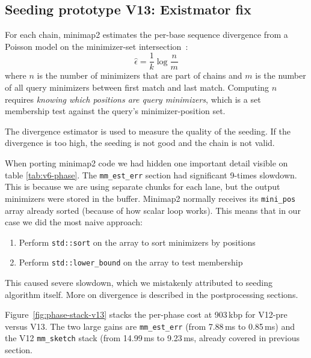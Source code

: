 \subsection{Seeding prototype V13: Existmator fix}
\label{sec:minimizer-divergence-history}

For each chain, minimap2 estimates the per-base sequence divergence
from a Poisson model on the minimizer-set
intersection~\cite{minimap2_paper}:
\[
\hat{\epsilon} = \frac{1}{k} \log \frac{n}{m}
\]
where $n$ is the number of minimizers that are part of chains and $m$ is the number of all query minimizers between first match and last match.  Computing $n$ requires
\emph{knowing which positions are query minimizers}, which is a set
membership test against the query's minimizer-position set.

The divergence estimator is used to measure the quality of the seeding. If the divergence is too high, the seeding is not good and the chain is not valid.

When porting minimap2 code we had hidden one important detail visible on table \ref{tab:v6-phase}. The \texttt{mm\_est\_err} section had significant 9-times slowdown. This is because we are using separate chunks for each lane, but the output minimizers were stored in the buffer.
Minimap2 normally receives its \texttt{mini\_pos} array already sorted (because of how scalar loop works). This means that in our case we did the most naive approach:
\begin{enumerate}
\item Perform \texttt{std::sort} on the array to sort minimizers by positions
\item Perform \texttt{std::lower\_bound} on the array to test membership
\end{enumerate}

This caused severe slowdown, which we mistakenly attributed to seeding algorithm itself. More on divergence is described in the postprocessing sections.

Figure~\ref{fig:phase-stack-v13} stacks the per-phase cost at
903\,kbp for V12-pre versus V13.  The two large gains are
\texttt{mm\_est\_err} (from 7.88\,ms to 0.85\,ms) and the V12
\texttt{mm\_sketch} stack (from 14.99\,ms to 9.23\,ms, already
covered in previous section.

